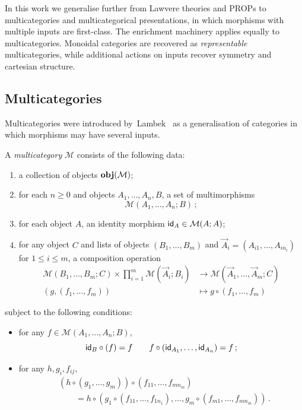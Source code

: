 In this work we generalise further from Lawvere theories and PROPs to multicategories and multicategorical presentations, in which morphisms with multiple inputs are first-class.
The enrichment machinery applies equally to multicategories.
Monoidal categories are recovered as \emph{representable} multicategories, while additional actions on inputs recover symmetry and cartesian structure.

\subsection{Multicategories}
\label{sec:multicategories}

Multicategories were introduced by~Lambek~\cite{LambekMulticategories} as a generalisation of categories in which morphisms may have several inputs.

\begin{definition}[Multicategory]
\label{def:multicategory}
    A \emph{multicategory} $\mathcal{M}$ consists of the following data:
    \begin{enumerate}
        \item a collection of objects ${\mathbf{obj}(\mathcal{M})}$;
        \item for each $n \geq 0$ and objects $A_1, \ldots, A_n, B$, a set of multimorphisms
        \[\mathcal{M}(A_1, \ldots, A_n; B)\,;\]
        \item for each object $A$, an identity morphism $\textsf{id}_A \in \mathcal{M}(A; A)$;
        \item for any object $C$ and lists of objects $(B_1, \ldots, B_m)$ and $\vec A_i=(A_{i1}, \ldots, A_{in_i})$ for $1 \leq i \leq m$, a composition operation
        \begin{align*}
            \mathcal{M}(B_1, \ldots, B_m;C) \times \prod_{i=1}^{m}\mathcal{M}(\vec A_i; B_i)
            &\to \mathcal{M}(\vec A_1,\ldots,\vec A_m;C)\\
            (g, (f_1, \ldots, f_m)) &\mapsto g \circ (f_1, \ldots, f_m)
        \end{align*}
    \end{enumerate}
    subject to the following conditions:
    \begin{itemize}
        \item for any $f \in \mathcal{M}(A_1, \ldots, A_n; B)$,
        \[
        \textsf{id}_{B} \circ (f) = f \qquad f \circ (\textsf{id}_{A_{1}}, \ldots, \textsf{id}_{A_n}) = f\,;
        \]
        \item for any $h,g_i,f_{ij}$,
        \[
        \begin{aligned}
        &(h \circ (g_1, \ldots, g_m)) \circ (f_{11}, \ldots, f_{mn_m})\\
        &\qquad={}
        h \circ (g_1 \circ (f_{11}, \ldots, f_{1n_1}), \ldots,
                  g_m \circ (f_{m1}, \ldots, f_{mn_m}))\,.
        \end{aligned}
        \]
    \end{itemize}
\end{definition}


